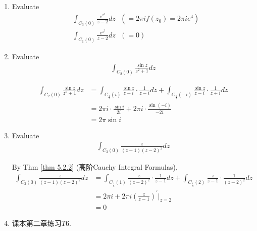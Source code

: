 \begin{enumerate}
		\item Evaluate
		\begin{align}
			&\int_{C_{3}(0)}{\frac{e^{z^2}}{z - 2} dz} \,\,\,\, ( = 2 \pi i f(z_0) = 2 \pi i e^4) \\
			&\int_{C_{1}(0)}{\frac{e^{z^2}}{z - 2} dz} \,\,\,\, ( = 0)
		\end{align}
	
		\vspace{2em}
		
		\item Evaluate
		\begin{align}
			\int_{C_{2}(0)}{\frac{\sin{z}}{z^2 + 1} dz}
		\end{align}
		
		\vspace{2em}
		\begin{solution}
			\begin{align}
				\int_{C_{2}(0)}{\frac{\sin{z}}{z^2 + 1} dz} 
				&= \int_{C_{\frac{1}{2}}(i)}{\frac{\sin{z}}{z + i} \cdot \frac{1}{z - i} dz} + \int_{C_{\frac{1}{2}}(-i)}{\frac{\sin{z}}{z - i} \cdot \frac{1}{z + i} dz} \\
				&= 2 \pi i \cdot \frac{\sin{i}}{2i} + 2 \pi i \cdot \frac{\sin{(-i)}}{-2i} \\
				&= 2\pi \sin{i}
			\end{align}
		\end{solution}
	
		\vspace{2em}
		
		\item Evaluate
		\begin{align}
			\int_{C_{3}(0)}{\frac{z}{(z - 1)(z - 2)^2} dz}
		\end{align}
	
		\vspace{2em}
		\begin{solution}
			By Thm \ref{thm 5.2.2} (高阶Cauchy Integral Formulas),
			\begin{align}
				\int_{C_{3}(0)}{\frac{z}{(z - 1)(z - 2)^2} dz} 
				&= \int_{C_{\frac{1}{3}}(1)}{\frac{z}{(z - 2)^2} \cdot \frac{1}{z - 1} dz} + \int_{C_{\frac{1}{3}}(2)}{\frac{z}{z - 1} \cdot \frac{1}{(z - 2)^2} dz} \\
				&= 2 \pi i + 2 \pi i \left( \frac{z}{z - 1} \right)^{'}\Big|_{z = 2} \\
				&= 0
			\end{align}
		\end{solution}
	
		\vspace{1em}
		
		\item 课本第二章练习$T6$.
	\end{enumerate}

